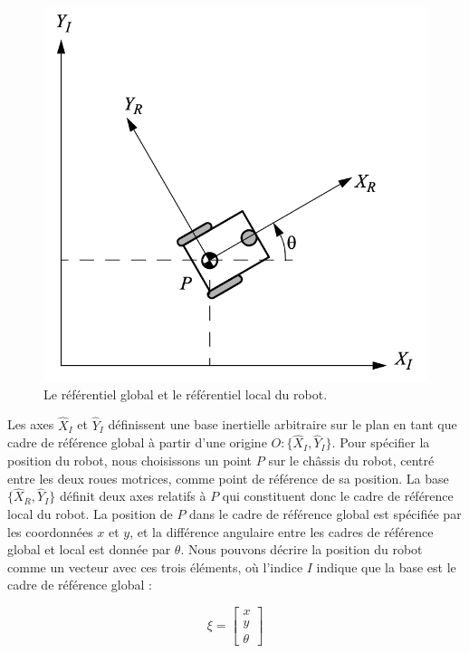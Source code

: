 \begin{figure}[h!]
    \centering
    \includegraphics[scale=0.5]{img/3_kinematic_model/reference_frames.png}
    \caption{Le référentiel global et le référentiel local du robot.}
    \label{fig:reference_frames}
\end{figure}

Les axes $\hat{X}_I$ et $\hat{Y}_I$ définissent une base inertielle arbitraire sur le plan en tant que cadre de référence global à partir d'une origine $O:\{ \hat{X}_I, \hat{Y}_I \}$. Pour spécifier la position du robot, nous choisissons un point $P$ sur le châssis du robot, centré entre les deux roues motrices, comme point de référence de sa position. La base $\{\hat{X}_R, \hat{Y}_I \}$ définit deux axes relatifs à $P$ qui constituent donc le cadre de référence local du robot. La position de $P$ dans le cadre de référence global est spécifiée par les coordonnées $x$ et $y$, et la différence angulaire entre les cadres de référence global et local est donnée par $\theta$. Nous pouvons décrire la position du robot comme un vecteur avec ces trois éléments, où l'indice $I$ indique que la base est le cadre de référence global :

\begin{equation}
    \xi = \left [
\begin{array}{l}
     x  \\
     y  \\
     \theta
\end{array}
    \right ]
    \label{eq:position}
\end{equation}

